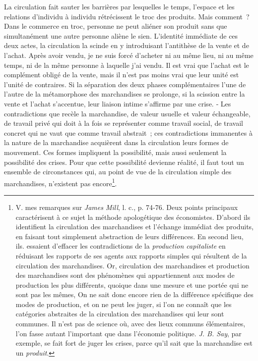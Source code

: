 \documentclass[french,twoside]{book} %
\begin{document}
La circulation fait sauter les barrières par lesquelles le temps, l’espace et les relations d’individu à individu rétrécissent le troc des produits. Mais comment ? Dans le commerce en troc, personne ne peut aliéner son produit sans que simultanément une autre personne aliène le sien. L’identité immédiate de ces deux actes, la circulation la scinde en y introduisant l’antithèse de la vente et de l’achat. Après avoir vendu, je ne suis forcé d’acheter ni au même lieu, ni au même temps, ni de la même personne à laquelle j’ai vendu. Il est vrai que l’achat est le complément obligé de la vente, mais il n’est pas moins vrai que leur unité est l’unité de contraires. Si la séparation des deux phases complémentaires l’une de l’autre de la métamorphose des marchandises se prolonge, si la scission entre la vente et l’achat s’accentue, leur liaison intime s’affirme par une crise. ‑ Les contradictions que recèle la marchandise, de valeur usuelle et valeur échangeable, de travail privé qui doit à la fois se représenter comme travail social, de travail concret qui ne vaut que comme travail abstrait ; ces contradictions immanentes à la nature de la marchandise acquièrent dans la circulation leurs formes de mouvement. Ces formes impliquent la possibilité, mais aussi seulement la possibilité des crises. Pour que cette possibilité devienne réalité, il faut tout un ensemble de circonstances qui, au point de vue de la circulation simple des marchandises, n’existent pas encore\footnote{V. mes remarques sur \emph{James Mill}, l. c., p. 74‑76. Deux points principaux caractérisent à ce sujet la méthode apologétique des économistes. D’abord ils identifient la circulation des marchandises et l’échange immédiat des produits, en faisant tout simplement abstraction de leurs différences. En second lieu, ils. essaient d’effacer les contradictions de la \emph{production capitaliste} en réduisant les rapports de ses agents aux rapports simples qui résultent de la circulation des marchandises. Or, circulation des marchandises et production des marchandises sont des phénomènes qui appartiennent aux modes de production les plus différents, quoique dans une mesure et une portée qui ne sont pas les mêmes, On ne sait donc encore rien de la différence spécifique des modes de production, et on ne peut les juger, si l’on ne connaît que les catégories abstraites de la circulation des marchandises qui leur sont communes. Il n’est pas de science où, avec des lieux communs élémentaires, l’on fasse autant l’important que dans l’économie politique. \emph{J. B. Say}, par exemple, se fait fort de juger les crises, parce qu’il sait que la marchandise est un \emph{produit}.}.
\end{document}
